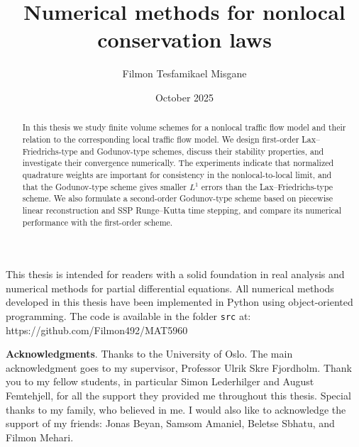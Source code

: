 \documentclass[UKenglish]{uiomasterthesis}
\title{Numerical methods for nonlocal conservation laws}
\author{Filmon Tesfamikael Misgane}
\date{October 2025}
\theoremstyle{definition}
\theoremstyle{definition}
\theoremstyle{remark}
\begin{document}
\uiomasterfp[dept={Department of Mathematics},  %
    program={Mathematics for Applications},                        %
    supervisor={Ulrik Skre Fjordholm},                    %
    long]                                     %

\frontmatter{}
\begin{abstract}
    In this thesis we study finite volume schemes for a nonlocal traffic flow model and their relation to the corresponding local traffic flow model. We design first-order Lax--Friedrichs-type and Godunov-type schemes, discuss their stability properties, and investigate their convergence numerically. The experiments indicate that normalized quadrature weights are important for consistency in the nonlocal-to-local limit, and that the Godunov-type scheme gives smaller \(L^1\) errors than the Lax--Friedrichs-type scheme. We also formulate a second-order Godunov-type scheme based on piecewise linear reconstruction and SSP Runge--Kutta time stepping, and compare its numerical performance with the first-order scheme.
\end{abstract}


\tableofcontents{}                          %
\listoffigures{}                            %
\listoftables{}                             %

\begin{preface}
    This thesis is intended for readers with a solid foundation in real analysis and numerical methods for partial differential equations. All numerical methods developed in this thesis have been implemented in Python using object-oriented programming. The code is available in the folder \texttt{src} at: https://github.com/Filmon492/MAT5960

    \textbf{Acknowledgments}. Thanks to the University of Oslo. The main acknowledgment goes to my supervisor, Professor Ulrik Skre Fjordholm. Thank you to my fellow students, in particular Simon Lederhilger and August Femtehjell, for all the support they provided me throughout this thesis. Special thanks to my family, who believed in me. I would also like to acknowledge the support of my friends: Jonas Beyan, Samsom Amaniel, Beletse Sbhatu, and Filmon Mehari.

\end{preface}
\end{document}
